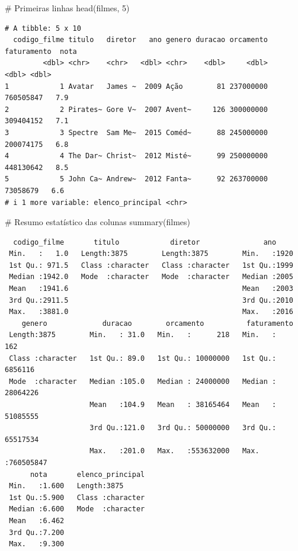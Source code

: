 \documentclass[
  letterpaper,
]{scrbook}
\newenvironment{Shaded}{\begin{snugshade}}{\end{snugshade}}
\newcommand{\CommentTok}[1]{\textcolor[rgb]{0.37,0.37,0.37}{#1}}
\newcommand{\DecValTok}[1]{\textcolor[rgb]{0.68,0.00,0.00}{#1}}
\newcommand{\FunctionTok}[1]{\textcolor[rgb]{0.28,0.35,0.67}{#1}}
\newcommand{\NormalTok}[1]{\textcolor[rgb]{0.00,0.23,0.31}{#1}}
\begin{document}
\begin{Shaded}
\begin{Highlighting}[]
\CommentTok{\# Primeiras linhas}
\FunctionTok{head}\NormalTok{(filmes, }\DecValTok{5}\NormalTok{)}
\end{Highlighting}
\end{Shaded}

\begin{verbatim}
# A tibble: 5 x 10
  codigo_filme titulo   diretor   ano genero duracao orcamento faturamento  nota
         <dbl> <chr>    <chr>   <dbl> <chr>    <dbl>     <dbl>       <dbl> <dbl>
1            1 Avatar   James ~  2009 Ação        81 237000000   760505847   7.9
2            2 Pirates~ Gore V~  2007 Avent~     126 300000000   309404152   7.1
3            3 Spectre  Sam Me~  2015 Coméd~      88 245000000   200074175   6.8
4            4 The Dar~ Christ~  2012 Misté~      99 250000000   448130642   8.5
5            5 John Ca~ Andrew~  2012 Fanta~      92 263700000    73058679   6.6
# i 1 more variable: elenco_principal <chr>
\end{verbatim}

\begin{Shaded}
\begin{Highlighting}[]
\CommentTok{\# Resumo estatístico das colunas}
\FunctionTok{summary}\NormalTok{(filmes)}
\end{Highlighting}
\end{Shaded}

\begin{verbatim}
  codigo_filme       titulo            diretor               ano      
 Min.   :   1.0   Length:3875        Length:3875        Min.   :1920  
 1st Qu.: 971.5   Class :character   Class :character   1st Qu.:1999  
 Median :1942.0   Mode  :character   Mode  :character   Median :2005  
 Mean   :1941.6                                         Mean   :2003  
 3rd Qu.:2911.5                                         3rd Qu.:2010  
 Max.   :3881.0                                         Max.   :2016  
    genero             duracao        orcamento          faturamento       
 Length:3875        Min.   : 31.0   Min.   :      218   Min.   :      162  
 Class :character   1st Qu.: 89.0   1st Qu.: 10000000   1st Qu.:  6856116  
 Mode  :character   Median :105.0   Median : 24000000   Median : 28064226  
                    Mean   :104.9   Mean   : 38165464   Mean   : 51085555  
                    3rd Qu.:121.0   3rd Qu.: 50000000   3rd Qu.: 65517534  
                    Max.   :201.0   Max.   :553632000   Max.   :760505847  
      nota       elenco_principal  
 Min.   :1.600   Length:3875       
 1st Qu.:5.900   Class :character  
 Median :6.600   Mode  :character  
 Mean   :6.462                     
 3rd Qu.:7.200                     
 Max.   :9.300                     
\end{verbatim}
\end{document}
